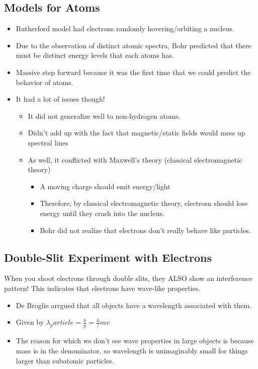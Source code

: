 \documentclass[a4paper,12pt]{report}
\begin{document}
\subsection{Models for Atoms}
\begin{itemize}
\item Rutherford model had electrons randomly hovering/orbiting a nucleus.
\item Due to the observation of distinct atomic spectra, Bohr predicted that there must be distinct energy levels that each atoms has.
\item Massive step forward because it was the first time that we could predict the behavior of atoms.
\item It had a lot of issues though!
\begin{itemize}
\item It did not generalize well to non-hydrogen atoms.
\item Didn't add up with the fact that magnetic/static fields would mess up spectral lines
\item As well, it conflicted with Maxwell's theory (classical electromagnetic theory)
\begin{itemize}
\item A moving charge should emit energy/light
\item Therefore, by classical electromagnetic theory, electrosn should lose energy until they crash into the nucleus.
\item Bohr did not realize that electrons don't really behave like particles.
\end{itemize}
\end{itemize}
\end{itemize}

\subsection{Double-Slit Experiment with Electrons}
When you shoot electrons through double slits, they ALSO show an interference pattern! This indicates that electrons have wave-like properties.
\begin{itemize}
\item De Broglie arrgued that all objects have a wavelength associated with them.
\item Given by $\lambda_particle = \frac{h}{p} = \frac{h}/{mv}$
\item The reason for which we don't see wave properties in large objects is because mass is in the denominator, so wavelength is unimaginably small for things larger than subatomic particles.
\end{itemize}
\end{document}
